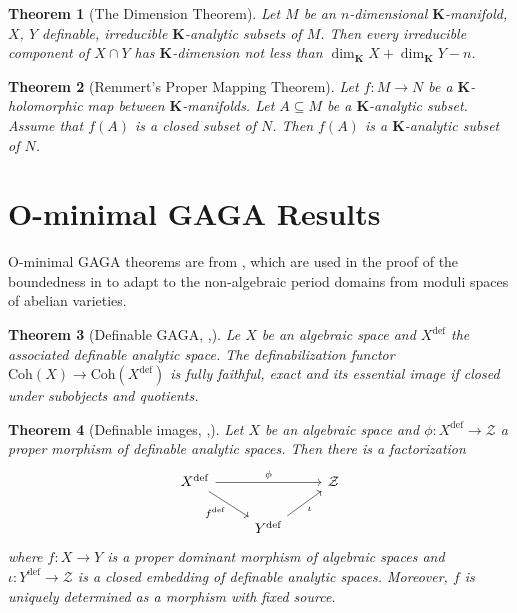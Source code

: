 \documentclass{amsart}
\newtheorem{theorem}{Theorem}[subsection]
\theoremstyle{definition}
\numberwithin{equation}{section}
\newcommand{\definable}{\mathrm{def}}
\begin{document}
\begin{theorem}[The Dimension Theorem]
  Let $M$ be an $n$-dimensional \hspace{0em}
  $\mathbf{K}$-manifold,
  $X$, $Y$ definable, irreducible $\mathbf{K}$-analytic subsets of $M$.
  Then every irreducible component of $X \cap Y$ has $\mathbf{K}$-dimension not less than $\dim_{\mathbf{K}}X + \dim_{\mathbf{K}}Y - n$.
\end{theorem}

\begin{theorem}[Remmert's Proper Mapping Theorem]
  Let $f: M \to N$ be a $\mathbf{K}$-holomorphic map between $\mathbf{K}$-manifolds.
  Let $A \subseteq M$ be a $\mathbf{K}$-analytic subset.
  Assume that $f(A)$ is a closed subset of $N$.
  Then $f(A)$ is a $\mathbf{K}$-analytic subset of $N$.
\end{theorem}

\section{O-minimal GAGA Results}
O-minimal GAGA theorems are from \cite{zbMATH07662555},
which are used in the proof of the boundedness in \cite{arXiv:2507.00973,arXiv:2508.19215}
to adapt to the non-algebraic period domains from moduli spaces of abelian varieties.

\begin{tcolorbox}[title = {\bfseries\Large Main results}]
  \begin{theorem}[{Definable GAGA, \cite[Theorem 2.1]{arXiv:2508.19215},\cite[Theorem 1.4]{zbMATH07662555}}]
    Le $X$ be an algebraic space and $X^{\definable}$ the associated definable analytic space.
    The definabilization functor $\mathrm{Coh}(X) \to \mathrm{Coh}(X^{\definable})$ is fully faithful, exact and 
    its essential image if closed under subobjects and quotients.
  \end{theorem}

  \begin{theorem}[{Definable images, \cite[Theorem 2.2]{arXiv:2508.19215},\cite[Theorem 1.3]{zbMATH07662555}}]
    \label{def image}
    Let $X$ be an algebraic space and 
    $\phi: X^{\definable} \to \mathcal{Z}$ a proper morphism of definable analytic spaces.
    Then there is a factorization
    \[\begin{tikzcd}
      X^{\definable}\ar[rr,"\phi"]\ar[dr,"f^{\definable}"'] & & \mathcal{Z} \\
                                                            & Y^{\definable}\ar[ur,"\iota"'] &
    \end{tikzcd}\]
    where $f: X\to Y$ is a proper dominant morphism of algebraic spaces and
    $\iota: Y^{\definable} \to \mathcal{Z}$ is a closed embedding of definable analytic spaces.
    Moreover, $f$ is uniquely determined as a morphism with fixed source.
  \end{theorem}
\end{tcolorbox}
\end{document}
